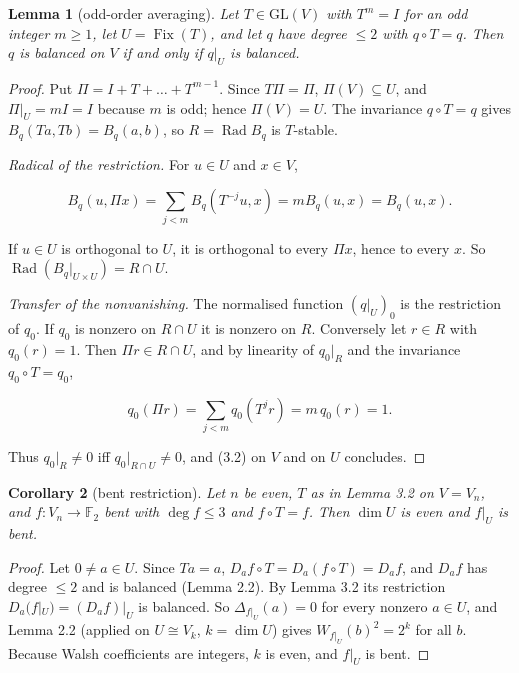 \documentclass[11pt,reqno]{amsart}
\newtheorem{lemma}{Lemma}[section]
\newtheorem{corollary}[lemma]{Corollary}
\begin{document}
\begin{lemma}[odd-order averaging]
Let $T\in\mathrm{GL}(V)$ with $T^m=I$ for an odd integer $m\ge1$, let $U=\operatorname{Fix}(T)$, and let $q$ have degree $\le2$ with $q\circ T=q$. Then $q$ is balanced on $V$ if and only if $q|_U$ is balanced.

\end{lemma}
\begin{proof}
Put $\Pi=I+T+\dots+T^{m-1}$. Since $T\Pi=\Pi$, $\Pi(V)\subseteq U$, and $\Pi|_U=mI=I$ because $m$ is odd; hence $\Pi(V)=U$. The invariance $q\circ T=q$ gives $B_q(Ta,Tb)=B_q(a,b)$, so $R=\operatorname{Rad}B_q$ is $T$-stable.

\emph{Radical of the restriction.} For $u\in U$ and $x\in V$,

\begin{equation*}B_q(u,\Pi x)=\sum_{j<m}B_q(T^{-j}u,x)=mB_q(u,x)=B_q(u,x).\end{equation*}

If $u\in U$ is orthogonal to $U$, it is orthogonal to every $\Pi x$, hence to every $x$. So $\operatorname{Rad}(B_q|_{U\times U})=R\cap U$.

\emph{Transfer of the nonvanishing.} The normalised function $(q|_U)_0$ is the restriction of $q_0$. If $q_0$ is nonzero on $R\cap U$ it is nonzero on $R$. Conversely let $r\in R$ with $q_0(r)=1$. Then $\Pi r\in R\cap U$, and by linearity of $q_0|_R$ and the invariance $q_0\circ T=q_0$,

\begin{equation*}q_0(\Pi r)=\sum_{j<m}q_0(T^jr)=m\,q_0(r)=1.\end{equation*}

Thus $q_0|_R\ne0$ iff $q_0|_{R\cap U}\ne0$, and (3.2) on $V$ and on $U$ concludes.
\end{proof}

\begin{corollary}[bent restriction]
Let $n$ be even, $T$ as in Lemma 3.2 on $V=V_n$, and $f:V_n\to\mathbb F_2$ bent with $\deg f\le3$ and $f\circ T=f$. Then $\dim U$ is even and $f|_U$ is bent.

\end{corollary}
\begin{proof}
Let $0\ne a\in U$. Since $Ta=a$, $D_af\circ T=D_a(f\circ T)=D_af$, and $D_af$ has degree $\le2$ and is balanced (Lemma 2.2). By Lemma 3.2 its restriction $D_a(f|_U)=(D_af)|_U$ is balanced. So $\Delta_{f|_U}(a)=0$ for every nonzero $a\in U$, and Lemma 2.2 (applied on $U\cong V_k$, $k=\dim U$) gives $W_{f|_U}(b)^2=2^k$ for all $b$. Because Walsh coefficients are integers, $k$ is even, and $f|_U$ is bent.
\end{proof}
\end{document}

